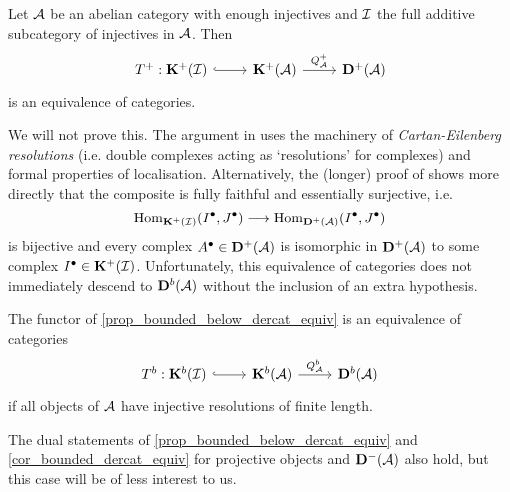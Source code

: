 \begin{proposition}
  \label{prop_bounded_below_dercat_equiv}
  Let $\abcat{A}$ be an abelian category with enough injectives and
  $\abcat{I}$ the full additive subcategory of injectives in $\abcat{A}$.
  Then
  \[
    \begin{tikzcd}
      {T^+:\homcat[+]{\abcat{I}}} & {\homcat[+]{\abcat{A}}} &
      {\dercat[+]{\abcat{A}}}
      \arrow[hook, from=1-1, to=1-2]
      \arrow["{\dercatlocln[+]{\abcat{A}}}", from=1-2, to=1-3]
    \end{tikzcd}
  \]
  is an equivalence of categories.
\end{proposition}

We will not prove this.
The argument in \cite{weibel} uses the machinery of
\emph{Cartan-Eilenberg resolutions} (i.e. double complexes acting as
`resolutions' for complexes) and formal properties of localisation.
Alternatively, the (longer) proof of
\cite[Proposition~2.40]{huybrechts} shows more directly that the
composite is fully faithful and essentially surjective, i.e.
\begin{equation}
  \label{eq_bij_dercat_homcat_injs}
  \Hom_{\homcat[+]{\abcat{I}}}(\cochaincomp{I}, \cochaincomp{J})
  \longrightarrow
  \Hom_{\dercat[+]{\abcat{A}}}(\cochaincomp{I}, \cochaincomp{J})
\end{equation}
is bijective and every complex $\cochaincomp{A} \in
\dercat[+]{\abcat{A}}$ is isomorphic in $\dercat[+]{\abcat{A}}$ to
some complex $\cochaincomp{I} \in \homcat[+]{\abcat{I}}$.
Unfortunately, this equivalence of categories does not immediately
descend to $\dercat[b]{\abcat{A}}$ without the inclusion of an extra hypothesis.

\begin{corollary}
  \label{cor_bounded_dercat_equiv}
  The functor of \cref{prop_bounded_below_dercat_equiv} is an
  equivalence of categories
  \[
    \begin{tikzcd}
      {T^b: \homcat[b]{\abcat{I}}} & {\homcat[b]{\abcat{A}}} &
      {\dercat[b]{\abcat{A}}}
      \arrow[hook, from=1-1, to=1-2]
      \arrow["{\dercatlocln[b]{\abcat{A}}}", from=1-2, to=1-3]
    \end{tikzcd}
  \]
  if all objects of $\abcat{A}$ have injective resolutions of finite length.
\end{corollary}

The dual statements of \cref{prop_bounded_below_dercat_equiv} and
\cref{cor_bounded_dercat_equiv} for projective objects and
$\dercat[-]{\abcat{A}}$ also hold, but this case will be of less interest to us.
